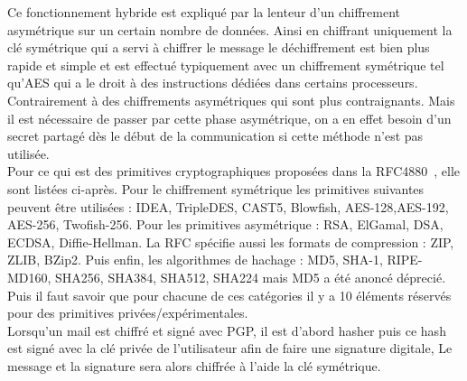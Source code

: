 Ce fonctionnement hybride est expliqué par la lenteur d’un chiffrement asymétrique sur un certain nombre de données. Ainsi en chiffrant uniquement la clé symétrique qui a servi à chiffrer le message le déchiffrement est bien plus rapide et simple et est effectué typiquement avec un chiffrement symétrique tel qu’AES qui a le droit à des instructions dédiées dans certains processeurs. Contrairement à des chiffrements asymétriques qui sont plus contraignants. Mais il est nécessaire de passer par cette phase asymétrique, on a en effet besoin d'un secret partagé dès le début de la communication si cette méthode n'est pas utilisée.\\
Pour ce qui est des primitives cryptographiques proposées dans la RFC4880~\cite{RFC4880}, elle sont listées ci-après. Pour le chiffrement symétrique les primitives suivantes peuvent être utilisées : IDEA, TripleDES, CAST5, Blowfish, AES-128,AES-192, AES-256, Twofish-256. Pour les primitives asymétrique : RSA, ElGamal, DSA, ECDSA, Diffie-Hellman. La RFC spécifie aussi les formats de compression : ZIP, ZLIB, BZip2. Puis enfin, les algorithmes de hachage : MD5, SHA-1, RIPE-MD160, SHA256, SHA384, SHA512, SHA224 mais MD5 a été anoncé déprecié. Puis il faut savoir que pour chacune de ces catégories il y a 10 éléments réservés pour des primitives privées/expérimentales.\\
 Lorsqu'un mail est chiffré et signé avec PGP, il est d'abord hasher puis ce hash est signé avec la clé privée de l'utilisateur afin de faire une signature digitale, Le message et la signature sera alors chiffrée à l'aide la clé symétrique.\\
 
